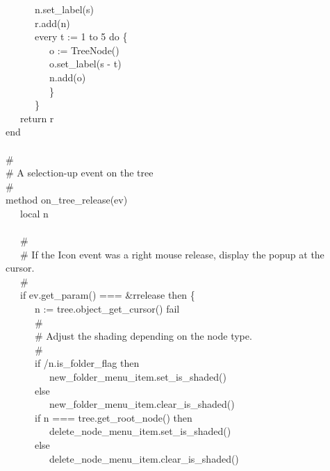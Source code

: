 {\>   \ \ \ \ \ \ n.set\_label(s) \\
\>   \ \ \ \ \ \ r.add(n) \\
\>   \ \ \ \ \ \ every t := 1 to 5 do \{ \\
\>   \ \ \ \ \ \ \ \ \ o := TreeNode() \\
\>   \ \ \ \ \ \ \ \ \ o.set\_label(s {\textbar}{\textbar}
{\textquotedbl}-{\textquotedbl} {\textbar}{\textbar}t) \\
\>   \ \ \ \ \ \ \ \ \ n.add(o) \\
\>   \ \ \ \ \ \ \ \ \ \} \\
\>   \ \ \ \ \ \ \} \\
\>   \ \ \ return r \\
\>   end \\
\ \\
\>   \# \\
\>   \# A selection-up event on the tree \\
\>   \# \\
\>   method on\_tree\_release(ev) \\
\>   \ \ \ local n \\
\ \\
\>   \ \ \ \# \\
\>   \ \ \ \# If the Icon event was a right mouse release, display the popup at the cursor. \\
\>   \ \ \ \# \\
\>   \ \ \ if ev.get\_param() === \&rrelease then \{ \\
\>   \ \ \ \ \ \ n := tree.object\_get\_cursor() {\textbar} fail \\
\>   \ \ \ \ \ \ \# \\
\>   \ \ \ \ \ \ \# Adjust the shading depending on the node type. \\
\>   \ \ \ \ \ \ \# \\
\>   \ \ \ \ \ \ if /n.is\_folder\_flag then \\
\>   \ \ \ \ \ \ \ \ \ new\_folder\_menu\_item.set\_is\_shaded() \\
\>   \ \ \ \ \ \ else \\
\>   \ \ \ \ \ \ \ \ \ new\_folder\_menu\_item.clear\_is\_shaded() \\
\>   \ \ \ \ \ \ if n === tree.get\_root\_node() then \\
\>   \ \ \ \ \ \ \ \ \ delete\_node\_menu\_item.set\_is\_shaded() \\
\>   \ \ \ \ \ \ else \\
\>   \ \ \ \ \ \ \ \ \ delete\_node\_menu\_item.clear\_is\_shaded() \\
}
